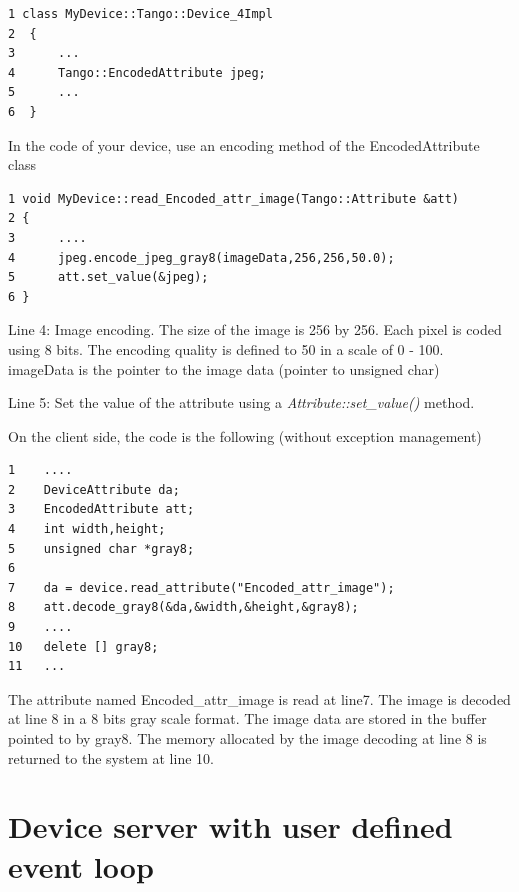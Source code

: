 \begin{verbatim}
1 class MyDevice::Tango::Device_4Impl
2  {
3      ...
4      Tango::EncodedAttribute jpeg;
5      ...
6  }
\end{verbatim}


In the code of your device, use an encoding method of the EncodedAttribute
class


\begin{verbatim}
1 void MyDevice::read_Encoded_attr_image(Tango::Attribute &att)
2 {
3      ....
4      jpeg.encode_jpeg_gray8(imageData,256,256,50.0);
5      att.set_value(&jpeg);
6 }
\end{verbatim}


Line 4: Image encoding. The size of the image is 256 by 256. Each
pixel is coded using 8 bits. The encoding quality is defined to 50
in a scale of 0 - 100. imageData is the pointer to the image data
(pointer to unsigned char)

Line 5: Set the value of the attribute using a \emph{Attribute::set\_value()}
method.

On the client side, the code is the following (without exception management)


\begin{verbatim}
1    ....
2    DeviceAttribute da;
3    EncodedAttribute att;
4    int width,height;
5    unsigned char *gray8;
6      
7    da = device.read_attribute("Encoded_attr_image");
8    att.decode_gray8(&da,&width,&height,&gray8);
9    ....
10   delete [] gray8;
11   ...
\end{verbatim}


The attribute named Encoded\_attr\_image is read at line7. The image
is decoded at line 8 in a 8 bits gray scale format. The image data
are stored in the buffer pointed to by \textquotedbl{}gray8\textquotedbl{}.
The memory allocated by the image decoding at line 8 is returned to
the system at line 10.


\section{Device server with user defined event loop}

